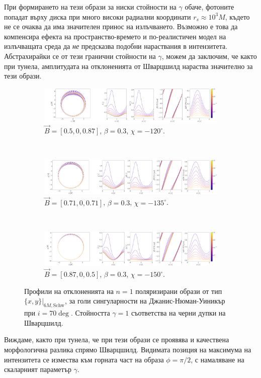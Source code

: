 При формирането на тези образи за ниски стойности на $\gamma$ обаче, фотоните попадат върху диска при много високи радиални координати $r_s\approx 10^3M$, където не се очаква да има значителен принос на излъчването. Възможно е това да компенсира ефекта на пространство-времето и по-реалистичен модел на излъчващата среда да \emph{не} предсказва подобни нараствания в интензитета. \\

Абстрахирайки се от тези гранични стойности на $\gamma$, можем да заключим, че както при тунела, амплитудата на отклоненията от Шварцшилд нараства значително за тези образи. 

\begin{figure}[!htb]
	\centering
	\begin{subfigure}{12cm}
		\hspace{-0.25cm}
		\includegraphics[scale = 0.13]{JNW_delta_fig_B_0.5_0.87_0_20_deg_r6_n1.png}
		\caption{$\vec{B} = [0.5, 0, 0.87]$, $\beta = 0.3$, $\chi = -120^\circ$.}
	\end{subfigure}\\
	\begin{subfigure}{12cm}
		\hspace{-0.25cm}
		\includegraphics[scale = 0.13]{JNW_delta_fig_B_0.71_0.71_0_20_deg_r6_n1.png}
		\caption{$\vec{B} = [0.71, 0, 0.71]$, $\beta = 0.3$, $\chi = -135^\circ$.}
	\end{subfigure}\\
	\begin{subfigure}{12cm}
		\hspace{-0.25cm}
		\includegraphics[scale = 0.13]{JNW_delta_fig_B_0.87_0.5_0_20_deg_r6_n1.png}
		\caption{$\vec{B} = [0.87, 0, 0.5]$, $\beta = 0.3$, $\chi = -150^\circ$.}
	\end{subfigure}
	\caption[Профили на отклоненията на $n = 1$ поляризирани образи oт тип $\{x,y\}\vert_{6M, \text{Schw}}$, за $i = 20\deg$ за голи сингуларности на Джанис-Нюман-Уиникър.]{\small Профили на отклоненията на $n = 1$ поляризирани образи от тип $\{x,y\}\vert_{6M, \text{Schw}}$, за голи сингуларности на Джанис-Нюман-Уиникър при $i = 70\deg$. Стойността $\gamma = 1$ съответства на черни дупки на Шварцшилд.} 
	\label{JNW_delta_r6_20_deg_n1}
\end{figure}

Виждаме, както при тунела, че при тези образи се проявява и качествена морфологична разлика спрямо Шварцшилд. Видимата позиция на максимума на интензитета се измества към горната част на образа $\phi = \pi / 2$, с намаляване на скаларният параметър $\gamma$.